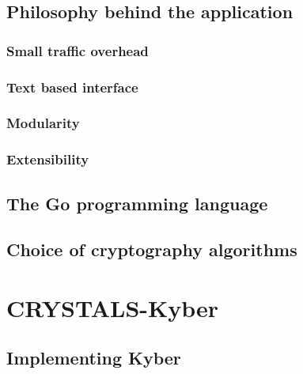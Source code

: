\section{Philosophy behind the application}
\label{sec:philo_behind_app}


\subsection{Small traffic overhead}
\label{subsec:network_footprint}


\subsection{Text based interface}
\label{subsec:text_based_interface}


\subsection{Modularity}
\label{subsec:modular_app}


\subsection{Extensibility}
\label{subsec:extensible_app}


\section{The Go programming language}
\label{sec:go_lang}


\section{Choice of cryptography algorithms}
\label{sec:implementations}


\chapter{CRYSTALS-Kyber}
\label{ch:kyber}


\section{Implementing Kyber}
\label{sec:implementing_kyber}


